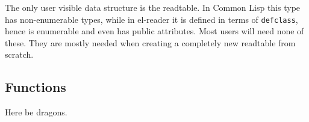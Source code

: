 \documentclass[a4paper,10pt,twoside]{article}
\newcommand{\cl}{Common Lisp}
\newcommand{\elr}{el-reader}
\newcommand{\fun}[1]{\texttt{#1}}
\begin{document}
The only user visible data structure is the readtable.  In \cl{} this type has
non-enumerable types, while in \elr{} it is defined in terms of
\fun{defclass}, hence is enumerable and even has public attributes.  Most users
will need none of these.  They are mostly needed when creating a completely new
readtable from scratch.

\subsection{Functions}
\label{subsec:functions}

Here be dragons.


\pagebreak


\end{document}
